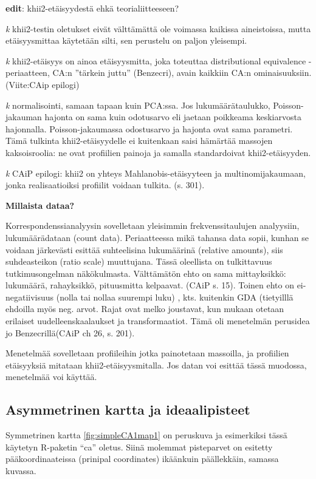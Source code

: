\documentclass[
  finnish,
]{book}
\begin{document}
\textbf{edit}: khii2-etäisyydestä ehkä teorialiitteeseen?

\emph{k} khii2-testin oletukset eivät välttämättä ole voimassa kaikissa aineistoissa,
mutta etäisyysmittaa käytetään silti, sen perustelu on paljon yleisempi.

\emph{k} khii2-etäisyys on ainoa etäisyysmitta, joka toteuttaa distributional
equivalence - periaatteen, CA:n ''tärkein juttu'' (Benzecri), avain kaikkiin CA:n
ominaisuuksiin. (Viite:CAip epilogi)

\emph{k} normalisointi, samaan tapaan kuin PCA:ssa. Jos lukumäärätaulukko,
Poisson-jakauman hajonta on sama kuin odotusarvo eli jaetaan poikkeama
keskiarvosta hajonnalla. Poisson-jakaumassa odostusarvo ja hajonta ovat sama
parametri. Tämä tulkinta khii2-etäisyydelle ei kuitenkaan saisi hämärtää massojen
kaksoisroolia: ne ovat profiilien painoja ja samalla standardoivat khii2-etäisyyden.

\emph{k} CAiP epilogi: khii2 on yhteys Mahlanobis-etäisyyteen ja multinomijakaumaan,
jonka realisaatioiksi profiilit voidaan tulkita. (s. 301).

\textbf{Millaista dataa?}

Korrespondenssianalyysin sovelletaan yleisimmin frekvenssitaulujen analyysiin,
lukumäärädataan (count data). Periaatteessa mikä tahansa data sopii, kunhan se
voidaan järkevästi esittää suhteelisina lukumäärinä (relative amounts), siis
suhdeasteikon (ratio scale) muuttujana. Tässä oleellista on tulkittavuus
tutkimusongelman näkökulmasta. Välttämätön ehto on sama mittayksikkö: lukumäärä,
rahayksikkö, pituusmitta kelpaavat. (CAiP s. 15).
Toinen ehto on ei-negatiivisuus (nolla tai nollaa suurempi luku) ,
kts. kuitenkin GDA (tietyilllä ehdoilla myös neg. arvot. Rajat ovat melko
joustavat, kun mukaan otetaan erilaiset uudelleenskaalaukset ja transformaatiot.
Tämä oli menetelmän perusidea jo Benzecrillä(CAiP ch 26, s. 201).

Menetelmää sovelletaan profiileihin jotka painotetaan massoilla, ja
profiilien etäisyyksiä mitataan khii2-etäisyysmitalla. Jos datan voi esittää
tässä muodossa, menetelmää voi käyttää.

\hypertarget{asymmetrinen-kartta-ja-ideaalipisteet}{%
\subsection{Asymmetrinen kartta ja ideaalipisteet}\label{asymmetrinen-kartta-ja-ideaalipisteet}}

Symmetrinen kartta \ref{fig:simpleCA1map1} on peruskuva ja esimerkiksi tässä
käytetyn R-paketin ``ca'' oletus. Siinä molemmat pisteparvet on esitetty
pääkoordinaateissa (prinipal coordinates) ikäänkuin päällekkäin, samassa kuvassa.
\end{document}
